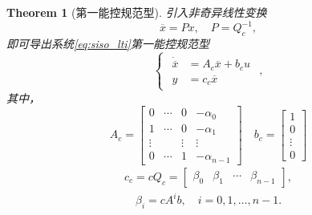 \documentclass[14pt,a4paper]{article}
\theoremstyle{plain}
\newtheorem{thm}{Theorem}[section]
\theoremstyle{definition}
\theoremstyle{remark}
\theoremstyle{plain}
\theoremstyle{plain}
\theoremstyle{plain}
\theoremstyle{definition}
\theoremstyle{remark}
\numberwithin{equation}{section}
\begin{document}
				\begin{thm}[第一能控规范型]  
				\label{the:第一能控规范型}
					引入非奇异线性变换
					\[
					\overline{x} = Px,\quad P = Q_c^{-1}
					,\] 
					即可导出系统\eqref{eq:siso_lti}第一能控规范型
					\begin{equation}
					\label{eq:ctrl_canonical}
						\begin{cases}
							\begin{aligned}
								\dot{\overline{x}} &= A_c \overline{x} + b_c u \\
								y &= c_c \overline{x}
							\end{aligned}  
						\end{cases} 
					,\end{equation}
					其中，
					\begin{equation}
					\label{eq:ctrl_canonical_1_Ab}
						A_c = \begin{bmatrix}
							0 & \cdots & 0& -\alpha_0 \\ 
							1 & \cdots & 0&-\alpha_1 \\ 
							\vdots &&\vdots&\vdots \\ 
							0 & \cdots & 1 & -\alpha_{n-1}
						\end{bmatrix} \quad 
						b_c = \begin{bmatrix}
							1 \\ 
							0 \\ 
							\vdots\\
							0
						\end{bmatrix} 
					\end{equation} 
					\begin{equation}
					\label{eq:ctrl_canonical_1_c}
					\begin{aligned}
						c_c = cQ_c = \begin{bmatrix}
							\beta_0 & \beta_1 & \cdots & \beta_{n-1}
						\end{bmatrix},\\ 
						\quad \beta_{i}=cA^i b,\quad i=0,1,\ldots ,n-1.
					\end{aligned}  
					\end{equation} 
				\end{thm} 
\end{document}
